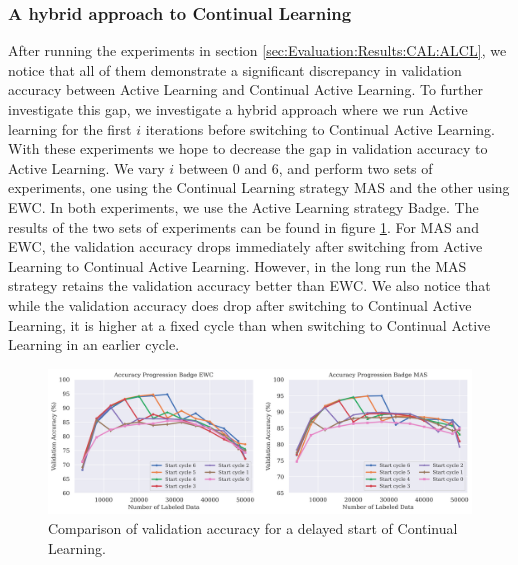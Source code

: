 \subsubsection{A hybrid approach to Continual Learning}
\label{sec:Evaluation:Results:CAL:Hybrid}
After running the experiments in section \ref{sec:Evaluation:Results:CAL:ALCL}, we notice that all of them demonstrate a significant discrepancy in validation accuracy between Active Learning and Continual Active Learning. To further investigate this gap,
we investigate a hybrid approach where we run Active learning for the first $i$ iterations before switching to Continual Active Learning. With these experiments we hope to decrease the gap in validation accuracy to Active Learning. We vary $i$ between 0 and 6,
and perform two sets of experiments, one using the Continual Learning strategy MAS and the other using EWC. In both experiments, we use the Active Learning strategy Badge. The results of the two sets of experiments can be found in figure 
\ref{fig:Evaluation:Results:CAL:DelayedStart}. For MAS and EWC, the validation accuracy drops immediately after switching from Active Learning to Continual Active Learning. However, in the long run the MAS strategy retains the validation accuracy better than EWC.
We also notice that while the validation accuracy does drop after switching to Continual Active Learning, it is higher at a fixed cycle than when switching to Continual Active Learning in an earlier cycle. \par

\begin{figure}[h]
    \centering
    \includegraphics[width=\linewidth]{images/results_CAL/Delayed_start_CAL.png}
    \caption[Continual Active Learning Hybrid approach]{Comparison of validation accuracy for a delayed start of Continual Learning. }
    \label{fig:Evaluation:Results:CAL:DelayedStart}
\end{figure}

